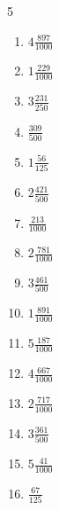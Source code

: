 \documentclass[12pt]{article}
\begin{document}
\begin{multicols}{5}
\begin{enumerate}
\item $ 4 \frac{897}{1000} $
\item $ 1 \frac{229}{1000} $
\item $ 3 \frac{231}{250} $
\item $ \frac{309}{500} $
\item $ 1 \frac{56}{125} $
\item $ 2 \frac{421}{500} $
\item $ \frac{213}{1000} $
\item $ 2 \frac{781}{1000} $
\item $ 3 \frac{461}{500} $
\item $ 1 \frac{891}{1000} $
\item $ 5 \frac{187}{1000} $
\item $ 4 \frac{667}{1000} $
\item $ 2 \frac{717}{1000} $
\item $ 3 \frac{361}{500} $
\item $ 5 \frac{41}{1000} $
\item $ \frac{67}{125} $
\end{enumerate}\end{multicols}\newpage
\end{document}

